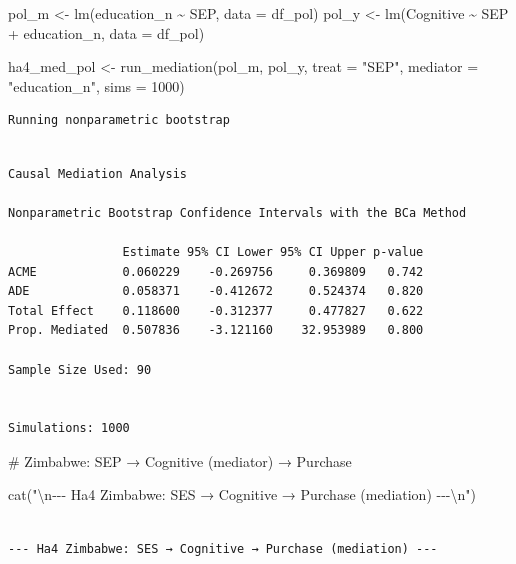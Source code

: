 \documentclass[
  letterpaper,
  DIV=11,
  numbers=noendperiod]{scrartcl}
\newenvironment{Shaded}{\begin{snugshade}}{\end{snugshade}}
\newcommand{\AttributeTok}[1]{\textcolor[rgb]{0.40,0.45,0.13}{#1}}
\newcommand{\CommentTok}[1]{\textcolor[rgb]{0.37,0.37,0.37}{#1}}
\newcommand{\DecValTok}[1]{\textcolor[rgb]{0.68,0.00,0.00}{#1}}
\newcommand{\FunctionTok}[1]{\textcolor[rgb]{0.28,0.35,0.67}{#1}}
\newcommand{\NormalTok}[1]{\textcolor[rgb]{0.00,0.23,0.31}{#1}}
\newcommand{\OtherTok}[1]{\textcolor[rgb]{0.00,0.23,0.31}{#1}}
\newcommand{\SpecialCharTok}[1]{\textcolor[rgb]{0.37,0.37,0.37}{#1}}
\newcommand{\StringTok}[1]{\textcolor[rgb]{0.13,0.47,0.30}{#1}}
\begin{document}
\begin{Shaded}
\begin{Highlighting}[]
\NormalTok{pol\_m }\OtherTok{\textless{}{-}} \FunctionTok{lm}\NormalTok{(education\_n }\SpecialCharTok{\textasciitilde{}}\NormalTok{ SEP, }\AttributeTok{data =}\NormalTok{ df\_pol)}
\NormalTok{pol\_y }\OtherTok{\textless{}{-}} \FunctionTok{lm}\NormalTok{(Cognitive }\SpecialCharTok{\textasciitilde{}}\NormalTok{ SEP }\SpecialCharTok{+}\NormalTok{ education\_n, }\AttributeTok{data =}\NormalTok{ df\_pol)}

\NormalTok{ha4\_med\_pol }\OtherTok{\textless{}{-}} \FunctionTok{run\_mediation}\NormalTok{(pol\_m, pol\_y, }\AttributeTok{treat =} \StringTok{"SEP"}\NormalTok{, }\AttributeTok{mediator =} \StringTok{"education\_n"}\NormalTok{,}
                              \AttributeTok{sims =} \DecValTok{1000}\NormalTok{)}
\end{Highlighting}
\end{Shaded}

\begin{verbatim}
Running nonparametric bootstrap
\end{verbatim}

\begin{verbatim}

Causal Mediation Analysis 

Nonparametric Bootstrap Confidence Intervals with the BCa Method

                Estimate 95% CI Lower 95% CI Upper p-value
ACME            0.060229    -0.269756     0.369809   0.742
ADE             0.058371    -0.412672     0.524374   0.820
Total Effect    0.118600    -0.312377     0.477827   0.622
Prop. Mediated  0.507836    -3.121160    32.953989   0.800

Sample Size Used: 90 


Simulations: 1000 
\end{verbatim}

\begin{Shaded}
\begin{Highlighting}[]
\CommentTok{\# Zimbabwe: SEP → Cognitive (mediator) → Purchase}

\FunctionTok{cat}\NormalTok{(}\StringTok{"}\SpecialCharTok{\textbackslash{}n}\StringTok{{-}{-}{-} Ha4 Zimbabwe: SES → Cognitive → Purchase (mediation) {-}{-}{-}}\SpecialCharTok{\textbackslash{}n}\StringTok{"}\NormalTok{)}
\end{Highlighting}
\end{Shaded}

\begin{verbatim}

--- Ha4 Zimbabwe: SES → Cognitive → Purchase (mediation) ---
\end{verbatim}
\end{document}
